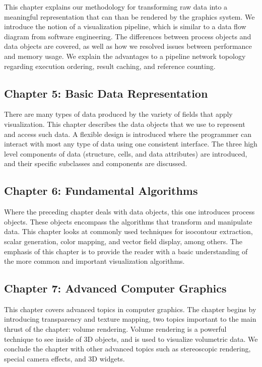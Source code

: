 This chapter explains our methodology for transforming raw data into a meaningful representation that can than be rendered by the graphics system. We introduce the notion of a visualization pipeline, which is similar to a data flow diagram from software engineering. The differences between process objects and data objects are covered, as well as how we resolved issues between performance and memory usage. We explain the advantages to a pipeline network topology regarding execution ordering, result caching, and reference counting.

\subsection*{Chapter 5: Basic Data Representation}

There are many types of data produced by the variety of fields that apply visualization. This chapter describes the data objects that we use to represent and access such data. A flexible design is introduced where the programmer can interact with most any type of data using one consistent interface. The three high level components of data (structure, cells, and data attributes) are introduced, and their specific subclasses and components are discussed.

\subsection*{Chapter 6: Fundamental Algorithms}

Where the preceding chapter deals with data objects, this one introduces process objects. These objects encompass the algorithms that transform and manipulate data. This chapter looks at commonly used techniques for isocontour extraction, scalar generation, color mapping, and vector field display, among others. The emphasis of this chapter is to provide the reader with a basic understanding of the more common and important visualization algorithms.

\subsection*{Chapter 7: Advanced Computer Graphics}

This chapter covers advanced topics in computer graphics. The chapter begins by introducing transparency and texture mapping, two topics important to the main thrust of the chapter: volume rendering. Volume rendering is a powerful technique to see inside of 3D objects, and is used to visualize volumetric data. We conclude the chapter with other advanced topics such as stereoscopic rendering, special camera effects, and 3D widgets.

